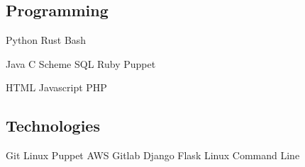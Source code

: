 \documentclass[letterpaper]{deedy-resume} %
\newcommand{\bul}{\textbullet{}}
\begin{document}
\begin{minipage}[t]{0.33\textwidth}
\subsection{Programming}


Python \bul Rust \bul Bash


Java \bul C \bul Scheme \bul SQL \bul Ruby \bul Puppet


HTML \bul Javascript \bul PHP

\sectionspace %

\subsection{Technologies}

Git \bul Linux \bul Puppet \bul AWS \bul Gitlab \bul Django \bul Flask
\bul Linux Command Line


\end{minipage} %
\hfill
%
%
\end{document}
